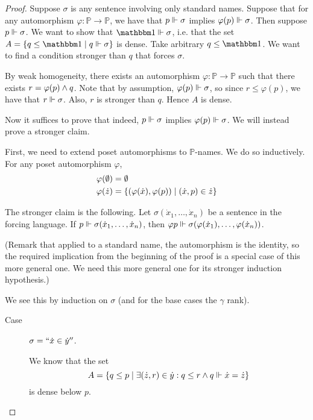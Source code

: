 \documentclass[11pt]{article}
\renewcommand{\P}{\mathbb{P}}
\renewcommand{\phi}{\varphi}
\begin{document}
\begin{proof}
    Suppose $\sigma$ is any sentence involving only standard names.
    Suppose that for any automorphism $\phi : \P \to \P$, we have that
    $p \Vdash \sigma$ implies $\phi(p) \forces \sigma$.
    Then suppose $p \Vdash \sigma$.
    We want to show that $\one \forces \sigma$,
    i.e. that the set $A = \setof{q \leq \one \sth q \forces \sigma}$ is dense.
    Take arbitrary $q \leq \one$.
    We want to find a condition stronger than $q$ that forces $\sigma$.

    By weak homogeneity,
    there exists an automorphism $\phi : \P \to \P$ such that there exists
    $r = \phi(p) \meet q$.
    Note that by assumption, $\phi(p) \forces \sigma$, so since
    $r \leq \phi(p)$, we have that $r \Vdash \sigma$.
    Also, $r$ is stronger than $q$. Hence $A$ is dense.

    Now it suffices to prove that indeed,
    $p \Vdash \sigma$ implies $\phi(p) \forces \sigma$.
    We will instead prove a stronger claim.

    First, we need to extend poset automorphisms to $\P$-names.
    We do so inductively. For any poset automorphism $\phi$,
    \begin{align*}
        \phi(\emptyset) &= \emptyset \\
        \phi(\dot z) &= \setof{
            (\phi(\dot x), \phi(p)) \sth
            (\dot x, p) \in \dot z
        }
    \end{align*}

    The stronger claim is the following.
    Let $\sigma(\dot x_1, \ldots, \dot x_n)$ be a sentence in the forcing
    language.
    If $p \Vdash \sigma(\dot x_1, \ldots, \dot x_n)$,
    then $\phi p \forces \sigma(\phi(\dot x_1), \ldots, \phi(\dot x_n))$.

    (Remark that applied to a standard name, the automorphism is the identity,
    so the required implication from the beginning of the proof is a special
    case of this more general one. We need this more general one for its
    stronger induction hypothesis.)

    We see this by induction on $\sigma$ (and for the base cases the $\gamma$
    rank).

    \begin{description}
        \item[Case] $\sigma = ``\dot x \in \dot y''$.

            We know that the set
            \begin{equation*}
                A = \left\{
                    q \leq p \;\vert\;
                    \exists (\dot z, r) \in \dot y :
                    q \leq r \land q \Vdash \dot x = \dot z
                \right\}
            \end{equation*}
            is dense below $p$.


\end{description}
\end{proof}
\end{document}
